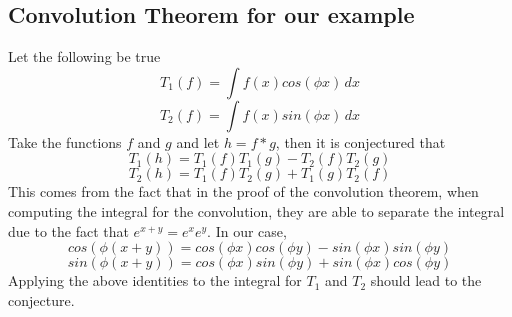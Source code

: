 \documentclass[11pt,psfig]{article}
\begin{document}
\setlength{\parskip}{1.2ex plus0.3ex minus 0.3ex}

\subsection*{Convolution Theorem for our example}

Let the following be true
\[
T_1(f) = \int{f(x) cos(\phi x) \,dx}
\]
\[
T_2(f) = \int{f(x) sin(\phi x) \,dx}
\]
Take the functions $f$ and $g$ and let $h = f*g$, then it is conjectured that
\[
T_1(h) = T_1(f) T_1(g) - T_2(f)T_2(g)
\]
\[
T_2(h) = T_1(f) T_2(g) + T_1(g)T_2(f)
\]
This comes from the fact that in the proof of the convolution theorem, when computing the integral for the convolution, they are able to separate the integral due to the fact that $e^{x+y} = e^x  e^y$. In our case,
\[
cos( \phi(x+y) ) = cos(\phi x)cos(\phi y) - sin(\phi x)sin(\phi y)
\]
\[
sin( \phi(x+y) ) = cos(\phi x)sin(\phi y) + sin(\phi x)cos(\phi y)
\]
Applying the above identities to the integral for $T_1$ and $T_2$ should lead to the conjecture. 
\end{document}
